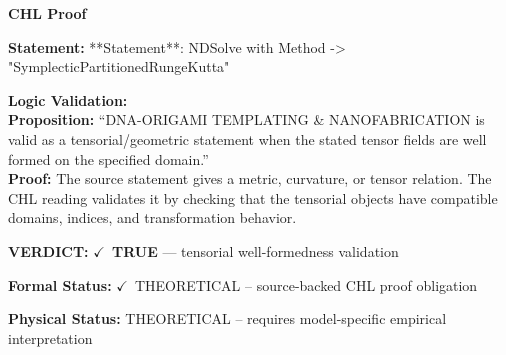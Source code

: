 \vspace{0.45em}
\noindent\textbf{CHL Proof}\par
\textbf{Statement:} **Statement**: NDSolve with Method -> "SymplecticPartitionedRungeKutta"

\textbf{Logic Validation:}\\
\textbf{Proposition:} ``DNA-ORIGAMI TEMPLATING \& NANOFABRICATION is valid as a tensorial/geometric statement
when the stated tensor fields are well formed on the specified domain.''\\
\textbf{Proof:} The source statement gives a metric, curvature, or tensor relation. The CHL reading
validates it by checking that the tensorial objects have compatible domains, indices,
and transformation behavior.

\textbf{VERDICT:} \ensuremath{\checkmark}\ \textbf{TRUE} --- tensorial well-formedness validation

\textbf{Formal Status:} \ensuremath{\checkmark}\ THEORETICAL -- source-backed CHL proof obligation

\textbf{Physical Status:} THEORETICAL -- requires model-specific empirical interpretation
\par\vspace{0.45em}
\par
\ifTZPDarkEdition
{}
\fi
\endgroup
\endgroup
